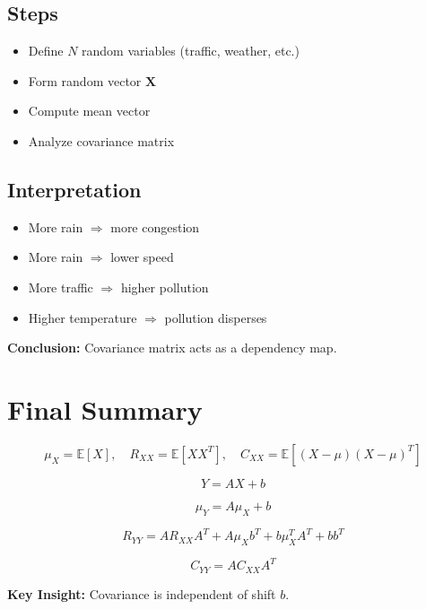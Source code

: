 \documentclass[11pt]{article}
\begin{document}
\subsection{Steps}

\begin{itemize}
    \item Define $N$ random variables (traffic, weather, etc.)
    \item Form random vector $\mathbf{X}$
    \item Compute mean vector
    \item Analyze covariance matrix
\end{itemize}

\subsection{Interpretation}

\begin{itemize}
    \item More rain $\Rightarrow$ more congestion
    \item More rain $\Rightarrow$ lower speed
    \item More traffic $\Rightarrow$ higher pollution
    \item Higher temperature $\Rightarrow$ pollution disperses
\end{itemize}

\textbf{Conclusion:} Covariance matrix acts as a dependency map.

\section{Final Summary}

\[
\mu_X = \mathbb{E}[X], \quad
R_{XX} = \mathbb{E}[XX^T], \quad
C_{XX} = \mathbb{E}[(X - \mu)(X - \mu)^T]
\]

\[
Y = AX + b
\]

\[
\mu_Y = A\mu_X + b
\]

\[
R_{YY} = A R_{XX} A^T + A\mu_X b^T + b\mu_X^T A^T + bb^T
\]

\[
C_{YY} = A C_{XX} A^T
\]

\textbf{Key Insight:} Covariance is independent of shift $b$.
\end{document}
